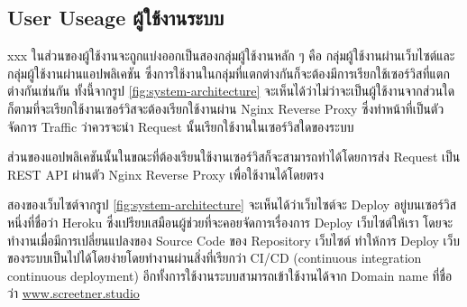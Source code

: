 
\subsection{\ifenglish User Useage \else ผู้ใช้งานระบบ \fi}
\ifenglish xxx 
\else 
ในส่วนของผู้ใช้งานจะถูกแบ่งออกเป็นสองกลุ่มผู้ใช้งานหลัก ๆ คือ กลุ่มผู้ใช้งานผ่านเว็บไซต์และกลุ่มผู้ใช้งานผ่านแอปพลิเคชัน ซึ่งการใช้งานในกลุ่มที่แตกต่างกันก็จะต้องมีการเรียกใช้เซอร์วิสที่แตกต่างกันเช่นกัน ทั้งนี้จากรูป \ref{fig:system-architecture} จะเห็นได้ว่าไม่ว่าจะเป็นผู้ใช้งานจากส่วนใดก็ตามที่จะเรียกใช้งานเซอร์วิสจะต้องเรียกใช้งานผ่าน Nginx Reverse Proxy ซึ่งทำหน้าที่เป็นตัวจัดการ Traffic ว่าควรจะนำ Request นั้นเรียกใช้งานในเซอร์วิสใดของระบบ

ส่วนของแอปพลิเคชันนั้นในขณะที่ต้องเรียนใช้งานเซอร์วิสก็จะสามารถทำได้โดยการส่ง Request เป็น REST API ผ่านตัว Nginx Reverse Proxy เพื่อใช้งานได้โดยตรง

สองของเว็บไซต์จากรูป \ref{fig:system-architecture} จะเห็นได้ว่าเว็บไซต์จะ Deploy อยู่บนเซอร์วิสหนึ่งที่ชื่อว่า Heroku ซึ่งเปรียบเสมือนผู้ช่วยที่จะคอยจัดการเรื่องการ Deploy เว็บไซต์ให้เรา โดยจะทำงานเมื่อมีการเปลี่ยนแปลงของ Source Code ของ Repository เว็บไซต์ ทำให้การ Deploy เว็บของระบบเป็นไปได้โดยง่ายโดยทำงานผ่านสิ่งที่เรียกว่า CI/CD (continuous integration continuous deployment) อีกทั้งการใช้งานระบบสามารถเข้าใช้งานได้จาก Domain name ที่ชื่อว่า \href{https://www.screetner.studio}{www.screetner.studio}
\fi